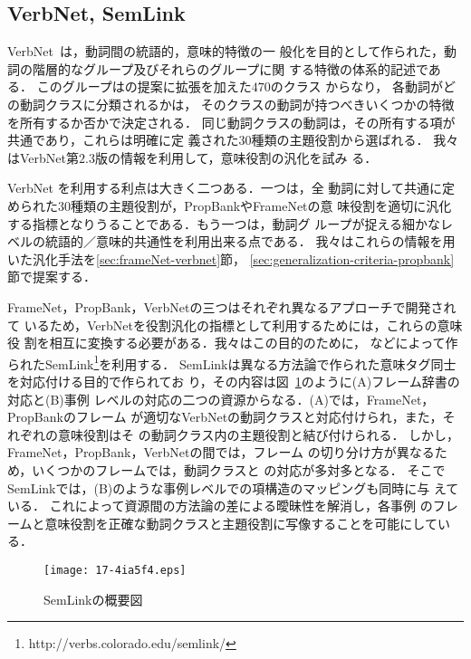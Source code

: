 \documentclass[japanese]{jnlp_1.4}
\begin{document}
\subsection{VerbNet, SemLink}
\label{sec:verbnet}

VerbNet~は，動詞間の統語的，意味的特徴の一
般化を目的として作られた，動詞の階層的なグループ及びそれらのグループに関
する特徴の体系的記述である．
このグループはの提案に拡張を加えた$470$のクラス
からなり， 各動詞がどの動詞クラスに分類されるかは，
そのクラスの動詞が持つべきいくつかの特徴を所有するか否かで決定される．
同じ動詞クラスの動詞は，その所有する項が共通であり，これらは明確に定
義された$30$種類の主題役割から選ばれる．
我々はVerbNet第$2.3$版の情報を利用して，意味役割の汎化を試み
る．

VerbNet
を利用する利点は大きく二つある．一つは，全
動詞に対して共通に定められた$30$種類の主題役割が，PropBankやFrameNetの意
味役割を適切に汎化する指標となりうることである．もう一つは，動詞グ
ループが捉える細かなレベルの統語的／意味的共通性を利用出来る点である．
我々はこれらの情報を用いた汎化手法を\ref{sec:frameNet-verbnet}節，
\ref{sec:generalization-criteria-propbank}節で提案する．


FrameNet，PropBank，VerbNetの三つはそれぞれ異なるアプローチで開発されて
いるため，VerbNetを役割汎化の指標として利用するためには，これらの意味役
割を相互に変換する必要がある．我々はこの目的のために，
などによって作られたSemLink\footnote{http://verbs.colorado.edu/semlink/}を利用する．
SemLinkは異なる方法論で作られた意味タグ同士を対応付ける目的で作られてお
り，その内容は図~\ref{fig:semlink}のように(A)フレーム辞書の対応と(B)事例
レベルの対応の二つの資源からなる．(A)では，FrameNet，PropBankのフレーム
が適切なVerbNetの動詞クラスと対応付けられ，また，それぞれの意味役割はそ
の動詞クラス内の主題役割と結び付けられる．
しかし，FrameNet，PropBank，VerbNetの間では，フレーム
の切り分け方が異なるため，いくつかのフレームでは，動詞クラスと
の対応が多対多となる．
そこでSemLinkでは，(B)のような事例レベルでの項構造のマッピングも同時に与
えている．
これによって資源間の方法論の差による曖昧性を解消し，各事例
のフレームと意味役割を正確な動詞クラスと主題役割に写像することを可能にしている．

\begin{figure}[b]
\begin{center}
\texttt{[image: 17-4ia5f4.eps]}
\end{center}
\caption{SemLinkの概要図}
\label{fig:semlink}
\end{figure}
\end{document}
